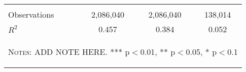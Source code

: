 \begin{table}[htpb!]
\begin{tabular}{lccc}
\vspace{4pt} & \begin{footnotesize}\end{footnotesize} & \begin{footnotesize}\end{footnotesize} \\
Observations & 2,086,040 & 2,086,040 & 138,014 \\
 $R^2$ & 0.457 & 0.384 & 0.052 \\ \hline
\multicolumn{4}{p{10cm}}{\begin{footnotesize} \textsc{Notes:} ADD NOTE HERE. *** p$<$0.01, ** p$<$0.05, * p$<$0.1\end{footnotesize}} \\
\end{tabular}
\end{table}
